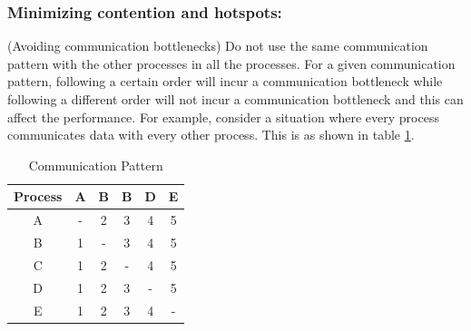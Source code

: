\documentclass[12pt]{article}
\begin{document}
\subsubsection{Minimizing contention and hotspots: }
(Avoiding communication bottlenecks) Do not use the same communication pattern with the other processes in all the processes.
For a given communication pattern, following a certain order will incur a communication bottleneck while following a different order will not incur a communication bottleneck and this can affect the performance.
For example, consider a situation where every process communicates data with every other process.
This is as shown in table \ref{tab:communication}.

\begin{table}[H]
    \centering
    \begin{tabular}{|c|c|c|c|c|c|}
        \hline
        Process & A & B & B & D & E \\
        \hline
        A & - & 2 & 3 & 4 & 5 \\
        B & 1 & - & 3 & 4 & 5 \\
        C & 1 & 2 & - & 4 & 5 \\
        D & 1 & 2 & 3 & - & 5 \\
        E & 1 & 2 & 3 & 4 & - \\
        \hline
    \end{tabular}
    \caption{Communication Pattern}
    \label{tab:communication}
\end{table}
\end{document}
